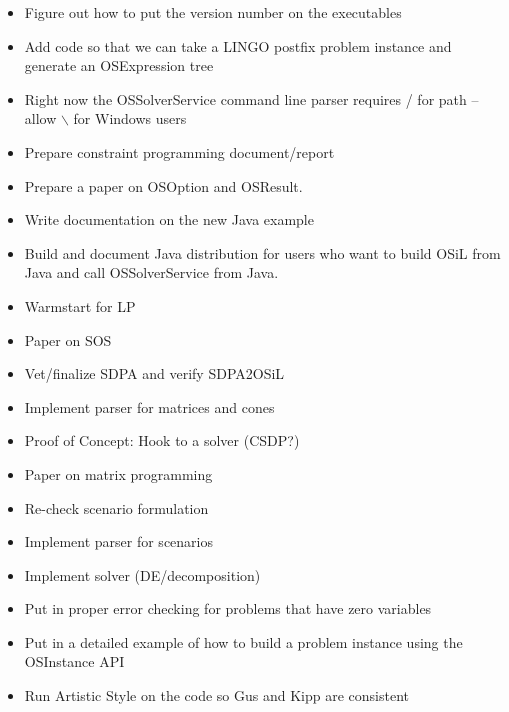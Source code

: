 \begin{itemize}
\item Figure out how to put the version number on the executables

\item Add code so that we can take a LINGO postfix problem instance and generate an OSExpression tree

\item Right now the OSSolverService command line parser requires / for path -- allow {$\backslash$} for Windows users

\item Prepare constraint programming document/report

\item Prepare a paper on OSOption and OSResult.

\item Write documentation on the new Java example 

\item Build and document Java distribution for users who want to build OSiL from Java and 
call OSSolverService from Java. 

\item Warmstart for LP

\item Paper on SOS

\item Vet/finalize SDPA and verify SDPA2OSiL

\item Implement parser for matrices and cones

\item Proof of Concept: Hook to a solver (CSDP?)

\item Paper on matrix programming

\item Re-check scenario formulation

\item Implement parser for scenarios

\item Implement solver (DE/decomposition)

\item Put in proper error checking for problems that have zero variables

\item Put in a detailed example of how to build a problem instance using the OSInstance API

\item Run Artistic Style on the code so Gus and Kipp are consistent


\end{itemize}

